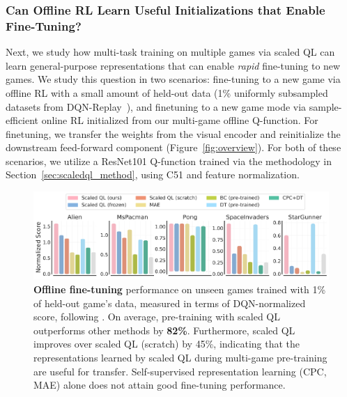 \vspace{-0.2cm}
\subsubsection{Can Offline RL Learn Useful Initializations that Enable Fine-Tuning?}
\label{sec:ft_off_on}
\vspace{-0.2cm}

Next, we study how multi-task training on multiple games via scaled QL can learn general-purpose representations that can enable \emph{rapid} fine-tuning to new games. We study this question in two scenarios: fine-tuning to a new game via offline RL with a small amount of held-out data (1\% uniformly subsampled datasets from DQN-Replay~\citep{agarwal2019optimistic}), and finetuning to a new game mode via sample-efficient online RL initialized from our multi-game offline Q-function. For finetuning, we transfer the weights from the visual encoder and reinitialize the downstream feed-forward component (Figure~\ref{fig:overview}). For both of these scenarios, we utilize a ResNet101 Q-function trained via the methodology in Section~\ref{sec:scaledql_method}, using C51 and feature normalization.

\begin{figure}[t]
    \centering
    \includegraphics[width=0.99\linewidth]{chapters/scaled_ql/figures/offline_ft.pdf}
    \vspace{-0.25cm}
    \caption{\footnotesize{\textbf{Offline fine-tuning} performance on unseen games trained with 1\% of held-out game's data, measured in terms of DQN-normalized score, following \citep{lee2022multi}. On average, pre-training with scaled QL outperforms other methods by \textbf{82\%}. Furthermore, scaled QL improves over scaled QL (scratch) by 45\%, indicating that the representations learned by scaled QL during multi-game pre-training are useful for transfer. Self-supervised representation learning (CPC, MAE) alone does not attain good fine-tuning performance.}}
    \label{fig:offline_ft}
    \vspace{-0.3cm}
\end{figure}

